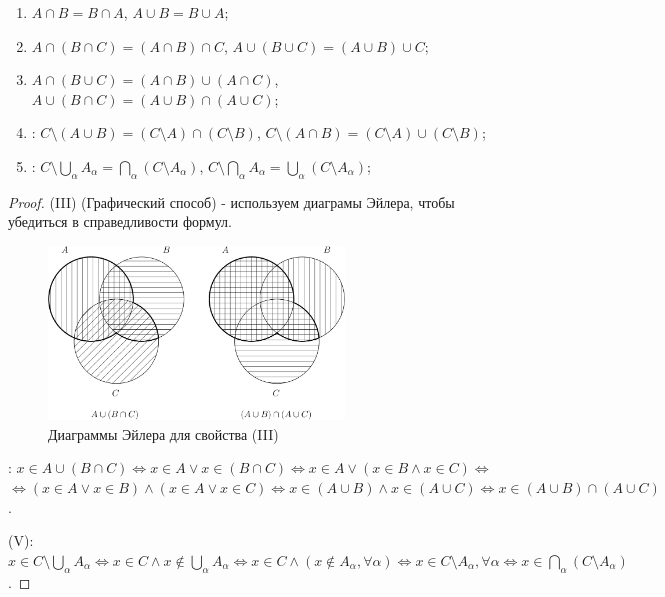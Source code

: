\documentclass[12pt]{article}
\theoremstyle{definition}
\begin{document}
\begin{enumerate}[label={(\Roman*)}]
	\item $A \cap B = B \cap A$, $A \cup B = B \cup A$;
	\item $A \cap (B \cap C) = (A \cap B) \cap C$, $A \cup (B \cup C) = (A \cup B) \cup C$;
	\item $A \cap (B \cup C) = (A \cap B) \cup (A \cap C)$, $A \cup (B \cap C) = (A \cup B) \cap (A \cup C)$;
	\item {}: $C \setminus (A\cup B) = (C \setminus A) \cap (C\setminus B)$, $C \setminus (A\cap B) = (C \setminus A) \cup (C\setminus B)$;
	\item {}: $C \setminus \bigcup\limits_\alpha A_\alpha = \bigcap\limits_\alpha (C \setminus A_\alpha)$, $C \setminus \bigcap\limits_\alpha A_\alpha = \bigcup\limits_\alpha (C \setminus A_\alpha)$;
\end{enumerate}
	
\begin{proof}
(III) (Графический способ) - используем диаграмы Эйлера, чтобы убедиться в справедливости формул.
\begin{figure}[H]
	\centering
	\includegraphics[width = 0.7\textwidth]{3_4.png}
	\caption{Диаграммы Эйлера для свойства (III)}
	\label{fig:3_4}
\end{figure}

: $x \in A \cup (B\cap C) \Leftrightarrow x\in A \vee x \in (B \cap C) \Leftrightarrow x \in A \vee (x\in B \wedge x\in C) \Leftrightarrow$\\
 $\Leftrightarrow (x \in A \vee x\in B) \wedge (x\in A \vee x \in C) \Leftrightarrow x \in (A\cup B)\wedge x \in (A \cup C) \Leftrightarrow x \in (A\cup B) \cap (A \cup C)$.

(V): $x \in C \setminus \bigcup\limits_\alpha A_\alpha \Leftrightarrow x \in C \wedge x \notin \bigcup\limits_\alpha A_\alpha \Leftrightarrow x \in C \wedge (x \notin A_\alpha, \forall \alpha) \Leftrightarrow x \in C \setminus A_\alpha, \forall \alpha \Leftrightarrow x \in \bigcap\limits_\alpha (C \setminus A_\alpha)$.
\end{proof}
	
\end{document}
